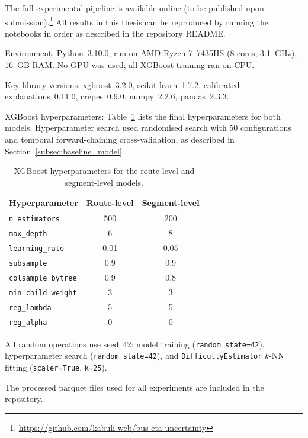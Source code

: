 \documentclass[12pt, a4paper, oneside]{report}
\begin{document}
The full experimental pipeline is available online (to be published upon submission).\footnote{\url{https://github.com/kabuli-web/bus-eta-uncertainty}} All results in this thesis can be reproduced by running the notebooks in order as described in the repository README.

Environment: Python~3.10.0, run on AMD Ryzen 7~7435HS (8 cores, 3.1~GHz), 16~GB RAM. No GPU was used; all XGBoost training ran on CPU.

Key library versions: xgboost~3.2.0, scikit-learn~1.7.2, calibrated-explanations~0.11.0, crepes~0.9.0, numpy~2.2.6, pandas~2.3.3.

XGBoost hyperparameters: Table~\ref{tab:hyperparams_repro} lists the final hyperparameters for both models.
Hyperparameter search used randomised search with 50 configurations and temporal forward-chaining cross-validation, as described in Section~\ref{subsec:baseline_model}.

\begin{table}[H]
\centering
\caption{XGBoost hyperparameters for the route-level and segment-level models.}
\label{tab:hyperparams_repro}
\begin{tabular}{lcc}
\toprule
\textbf{Hyperparameter} & \textbf{Route-level} & \textbf{Segment-level} \\
\midrule
\texttt{n\_estimators}     & 500  & 200  \\
\texttt{max\_depth}        & 6    & 8    \\
\texttt{learning\_rate}    & 0.01 & 0.05 \\
\texttt{subsample}         & 0.9  & 0.9  \\
\texttt{colsample\_bytree} & 0.9  & 0.8  \\
\texttt{min\_child\_weight}& 3    & 3    \\
\texttt{reg\_lambda}       & 5    & 5    \\
\texttt{reg\_alpha}        & 0    & 0    \\
\bottomrule
\end{tabular}
\end{table}

All random operations use seed~42: model training (\texttt{random\_state=42}), hyperparameter search (\texttt{random\_state=42}), and \texttt{DifficultyEstimator} $k$-NN fitting (\texttt{scaler=True}, \texttt{k=25}).

The processed parquet files used for all experiments are included in the repository.

\end{document}

